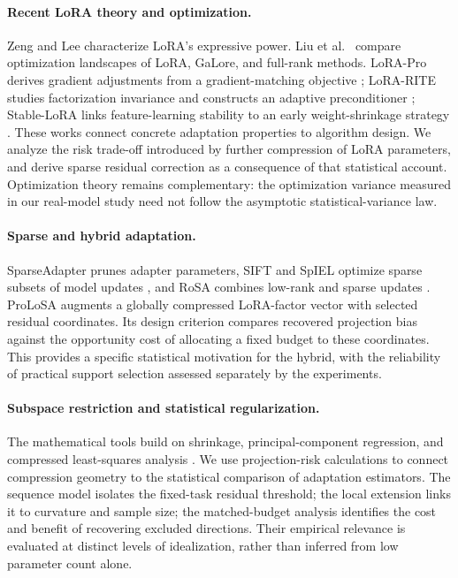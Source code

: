 \paragraph{Recent LoRA theory and optimization.}
Zeng and Lee \citep{zeng2024expressive} characterize LoRA's expressive power. Liu et al.\ \citep{liu2025landscape} compare optimization landscapes of LoRA, GaLore, and full-rank methods. LoRA-Pro derives gradient adjustments from a gradient-matching objective \citep{wang2025lorapro}; LoRA-RITE studies factorization invariance and constructs an adaptive preconditioner \citep{yen2025lorarite}; Stable-LoRA links feature-learning stability to an early weight-shrinkage strategy \citep{wu2026stablelora}. These works connect concrete adaptation properties to algorithm design. We analyze the risk trade-off introduced by further compression of LoRA parameters, and derive sparse residual correction as a consequence of that statistical account. Optimization theory remains complementary: the optimization variance measured in our real-model study need not follow the asymptotic statistical-variance law.

\paragraph{Sparse and hybrid adaptation.}
SparseAdapter \citep{he2022sparseadapter} prunes adapter parameters, SIFT and SpIEL optimize sparse subsets of model updates \citep{song2024sparse,ansell2024scaling}, and RoSA combines low-rank and sparse updates \citep{nikdan2024rosa}. ProLoSA augments a globally compressed LoRA-factor vector with selected residual coordinates. Its design criterion compares recovered projection bias against the opportunity cost of allocating a fixed budget to these coordinates. This provides a specific statistical motivation for the hybrid, with the reliability of practical support selection assessed separately by the experiments.

\paragraph{Subspace restriction and statistical regularization.}
The mathematical tools build on shrinkage, principal-component regression, and compressed least-squares analysis \citep{james1961estimation,hastie2009elements,maillard2009compressed,kaban2014new,thanei2017random}. We use projection-risk calculations to connect compression geometry to the statistical comparison of adaptation estimators. The sequence model isolates the fixed-task residual threshold; the local extension links it to curvature and sample size; the matched-budget analysis identifies the cost and benefit of recovering excluded directions. Their empirical relevance is evaluated at distinct levels of idealization, rather than inferred from low parameter count alone.

